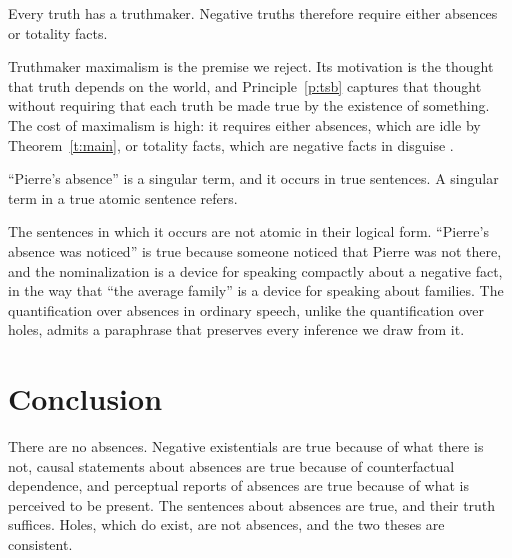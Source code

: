 \documentclass{situationist-preprint}
\begin{document}
\begin{objection}
Every truth has a truthmaker. Negative truths therefore require either absences or totality facts.
\end{objection}

\begin{reply}
Truthmaker maximalism is the premise we reject. Its motivation is the thought that truth depends on the world, and Principle~\ref{p:tsb} captures that thought without requiring that each truth be made true by the existence of something. The cost of maximalism is high: it requires either absences, which are idle by Theorem~\ref{t:main}, or totality facts, which are negative facts in disguise \citep{Molnar2000}.
\end{reply}

\begin{objection}[Reference]
\enquote{Pierre's absence} is a singular term, and it occurs in true sentences. A singular term in a true atomic sentence refers.
\end{objection}

\begin{reply}
The sentences in which it occurs are not atomic in their logical form. \enquote{Pierre's absence was noticed} is true because someone noticed that Pierre was not there, and the nominalization is a device for speaking compactly about a negative fact, in the way that \enquote{the average family} is a device for speaking about families. The quantification over absences in ordinary speech, unlike the quantification over holes, admits a paraphrase that preserves every inference we draw from it.
\end{reply}

\section{Conclusion}

There are no absences. Negative existentials are true because of what there is not, causal statements about absences are true because of counterfactual dependence, and perceptual reports of absences are true because of what is perceived to be present. The sentences about absences are true, and their truth suffices. Holes, which do exist, are not absences, and the two theses are consistent.
\end{document}
